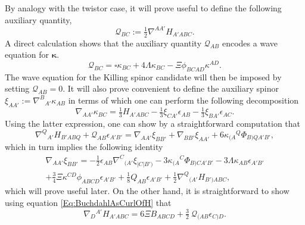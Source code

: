 \documentclass[10pt,a4paper]{article}
\theoremstyle{plain}
\begin{document}
By analogy with the twistor case, it will prove useful to define the
following auxiliary quantity,
\begin{equation}
  \mathcal{Q}_{BC} := \tfrac{1}{2}\nabla^{AA'}H_{A'ABC}.
  \label{Eq:WaveForKS_DefinitionQ}
\end{equation}
A direct calculation shows that the auxiliary quantity $\mathcal{Q}_{AB}$ encodes
a wave equation for $\bm\kappa$.
\begin{equation}
  \mathcal{Q}_{BC} = \square \kappa_{BC} + 4 \Lambda\kappa_{BC} - \Xi
  \phi_{BCAD}\kappa^{AD}. %
  \label{Eq:WaveForKS}
\end{equation}
The wave equation for the Killing spinor candidate will then
be imposed by setting $\mathcal{Q}_{AB}=0$. It will also prove convenient to
define the auxiliary spinor $\xi_{AA'} :=
\nabla^{B}{}_{A'}\kappa_{AB}$ in terms of which one can perform the
following decomposition 
\begin{equation}
\nabla_{AA'}\kappa_{BC} = \tfrac{1}{3} H_{A'ABC} - \tfrac{1}{3}
\xi_{CA'} \epsilon_{AB} - \tfrac{1}{3} \xi_{BA'}
\epsilon_{AC}.\label{Eq:DecompGradKS}
\end{equation}
Using the latter expression, one can show by a straightforward
computation that
\begin{equation}\label{eq:non-KillingVectorExplained}
  \nabla^Q{}_{A'}H_{B'ABQ} +  \mathcal{Q}_{AB} \epsilon_{A'B'} = \nabla_{AA'}\xi_{BB'} + \nabla_{BB'}\xi_{AA'} + 6 \kappa_{(A}{}^{Q} \Phi_{B)QA'B'},
\end{equation}
which in turn implies the following identity
\begin{multline}
\nabla_{AA'}\xi_{BB'} = - \tfrac{1}{2} \epsilon_{AB}
\nabla^{C}{}_{(A'}\xi_{|C|B')}- 3 \kappa_{(A}{}^{C} \Phi_{B)CA'B'} - 3
\Lambda \kappa_{AB} \epsilon_{A'B'} \\+ \tfrac{3}{4} \Xi \kappa^{CD}
\phi_{ABCD} \epsilon_{A'B'} + \tfrac{1}{8} Q_{AB} \epsilon_{A'B'} +
\tfrac{1}{2} \nabla^Q{}_{(A'}H_{B')ABC},\label{Eq:DecompGradXi}
\end{multline}
which will prove useful later. On the other hand, it is
straightforward to show using equation \eqref{Eq:BuchdahlAsCurlOfH} that
\begin{equation}
     \nabla_{D}{}^{A'}H_{A'ABC} = 6 \Xi B_{ABCD} + \tfrac{3}{2} \
\mathcal{Q}_{(AB}\epsilon_{C)D}.\label{IrrDecompCurlOfH}
\end{equation}
\end{document}

